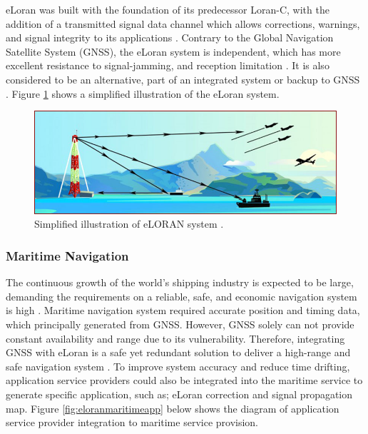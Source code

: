 \noindent eLoran was built with the foundation of its predecessor Loran-C, with the addition of a transmitted signal data channel which allows corrections, warnings, and signal integrity to its applications \cite{EnhancedApril}. Contrary to the Global Navigation Satellite System (GNSS), the eLoran system is independent, which has more excellent resistance to signal-jamming, and reception limitation \cite{Anonymous2009LORANELORAN}. It is also considered to be an alternative, part of an integrated system or backup to GNSS \cite{Son2020ELoran:Areas}. Figure \ref{fig:ELORAN_Ill} shows a simplified illustration of the eLoran system.

\begin{figure}[!ht]
    \centering
    \includegraphics[scale = 0.55]{Figures/ELORAN_Ilustration.jpg}
    \caption{Simplified illustration of eLORAN system \cite{Anonymous2009LORANELORAN}.}
    \label{fig:ELORAN_Ill}
\end{figure}
%
\subsubsection{Maritime Navigation}
The continuous growth of the world's shipping industry is expected to be large, demanding the requirements on a reliable, safe, and economic navigation system is high \cite{2004TheVision}. Maritime navigation system required accurate position and timing data, which principally generated from GNSS. However, GNSS solely can not provide constant availability and range due to its vulnerability. Therefore, integrating GNSS with eLoran is a safe yet redundant solution to deliver a high-range and safe navigation system \cite{InternationalLORANAssociation2007EnhancedApril}. To improve system accuracy and reduce time drifting, application service providers could also be integrated into the maritime service to generate specific application, such as; eLoran correction and signal propagation map. Figure \ref{fig:eloranmaritimeapp} below shows the diagram of application service provider integration to maritime service provision.\\

